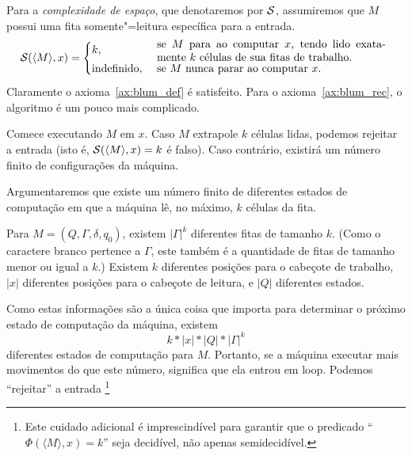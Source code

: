 \begin{example}
    \label{ex:space_complexity}
    Para a \emph{complexidade de espaço},
    que denotaremos por ${\mathcal{S}}$,
    assumiremos que $M$ possui uma fita somente"=leitura
    específica para a entrada.
    \begin{equation*}
        \PhiDS( \langle M \rangle, x) = \begin{cases}
            k, & \text{
                \parbox{0.6\textwidth}{
                    se~$M$ para ao computar~$x$,
                    tendo lido exatamente~$k$ células
                    de sua fitas de trabalho.
                }
            } \\
            \text{indefinido}, & \text{
                \parbox{0.6\textwidth}{
                    se $M$ nunca parar ao computar $x$.
                }
            }
        \end{cases}
    \end{equation*}
    Claramente o axioma~\ref{ax:blum_def} é satisfeito.
    Para o axioma~\ref{ax:blum_rec},
    o algoritmo é um pouco mais complicado.

    Comece executando $M$ em $x$.
    Caso $M$ extrapole $k$ células lidas,
    podemos rejeitar a entrada
    (isto é, ${\mathcal{S}}(\langle M \rangle, x) = k$ é falso).
    Caso contrário,
    existirá um número finito de configurações da máquina.

    Argumentaremos que existe um número finito de diferentes estados de computação
    em que a máquina lê, no máximo,
    $k$ células da fita.

    Para $M = (Q, \Gamma, \delta, q_0)$,
    existem $|\Gamma|^k$ diferentes fitas de tamanho $k$.
    (Como o caractere branco pertence a $\Gamma$,
    este também é a quantidade de fitas de tamanho menor ou igual a $k$.)
    Existem $k$ diferentes posições para o cabeçote de trabalho,
    $|x|$ diferentes posições para o cabeçote de leitura,
    e $|Q|$ diferentes estados.

    Como estas informações são a única coisa que importa
    para determinar o próximo estado de computação da máquina,
    existem
    \begin{equation}
        k * |x| * |Q| * |\Gamma|^k
        \label{eq:configurations_count}
    \end{equation}
    diferentes estados de computação para $M$.
    Portanto, se a máquina executar
    mais movimentos do que este número,
    significa que ela entrou em loop.
    Podemos ``rejeitar'' a entrada%
    \footnote{
        Este cuidado adicional é imprescindível
        para garantir que o predicado
        ``$\Phi(\langle M \rangle, x) = k$''
        seja decidível,
        não apenas semidecidível.

}
\end{example}
